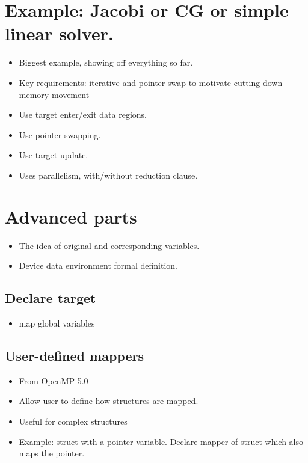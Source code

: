 \section{Example: Jacobi or CG or simple linear solver.}
\begin{itemize}
  \item Biggest example, showing off everything so far.
  \item Key requirements: iterative and pointer swap to motivate cutting down memory movement
  \item Use target enter/exit data regions.
  \item Use pointer swapping.
  \item Use target update.
  \item Uses parallelism, with/without reduction clause.
\end{itemize}


\section{Advanced parts}

\begin{itemize}
  \item The idea of original and corresponding variables.
  \item Device data environment formal definition.
\end{itemize}


\subsection{Declare target}
\label{ssec:declare_target}
\begin{itemize}
  \item map global variables
\end{itemize}


\subsection{User-defined mappers}
\label{sec:mapper}
\begin{itemize}
  \item From OpenMP 5.0
  \item Allow user to define how structures are mapped.
  \item Useful for complex structures
  \item Example: struct with a pointer variable. Declare mapper of struct which also maps the pointer.
\end{itemize}

